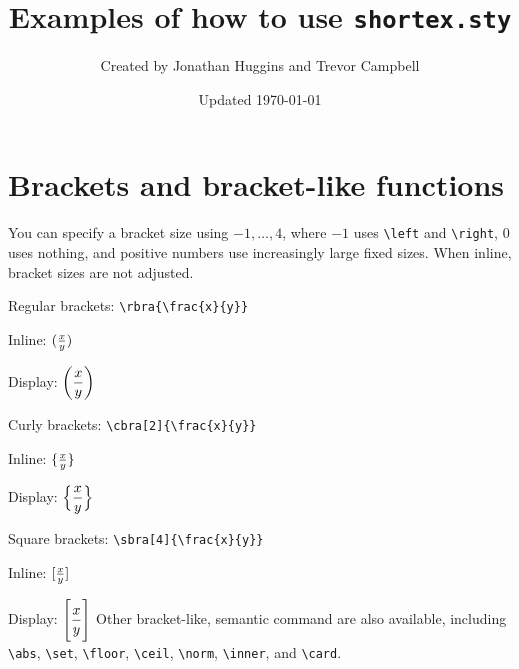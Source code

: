 \documentclass{article}
\title{Examples of how to use \texttt{shortex.sty}}
\author{Created by Jonathan Huggins and Trevor Campbell}
\date{Updated \today}
\begin{document}
\maketitle

\section{Brackets and bracket-like functions}

You can specify a bracket size using $-1,\dots,4$, where $-1$ uses \texttt{\textbackslash left} and \texttt{\textbackslash right}, $0$ uses nothing, and positive numbers 
use increasingly large fixed sizes. When inline, bracket sizes are not adjusted.

\bitems
\item Regular brackets:  \verb!\rbra{\frac{x}{y}}!
    \bitems
    \item Inline: $\rbra{\frac{x}{y}}$ 
    \item Display: $\displaystyle\rbra{\frac{x}{y}}$
    \eitems
\item Curly brackets: \verb!\cbra[2]{\frac{x}{y}}!
    \bitems
    \item Inline: $\cbra[2]{\frac{x}{y}}$
    \item Display: $\displaystyle\cbra[2]{\frac{x}{y}}$
    \eitems
\item Square brackets: \verb!\sbra[4]{\frac{x}{y}}!
    \bitems
    \item Inline: $\sbra[4]{\frac{x}{y}}$
    \item Display: $\displaystyle\sbra[4]{\frac{x}{y}}$
    \eitems
\eitems
Other bracket-like, semantic command are also available, including \verb!\abs!, \verb!\set!, \verb!\floor!, \verb!\ceil!, \verb!\norm!, \verb!\inner!, and \verb!\card!. 
\end{document}
